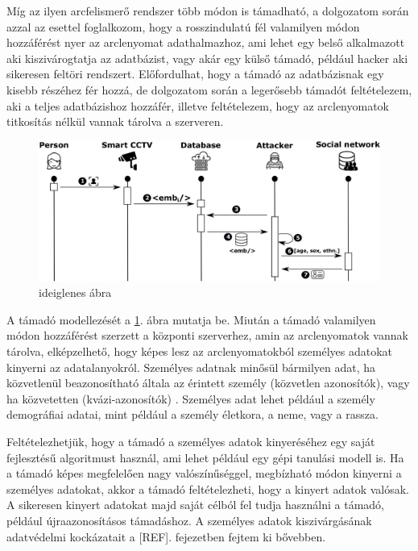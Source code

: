Míg az ilyen arcfelismerő rendszer több módon is támadható, a dolgozatom során azzal az esettel foglalkozom, hogy a rosszindulatú fél valamilyen módon hozzáférést nyer az arclenyomat adathalmazhoz, ami lehet egy belső alkalmazott aki kiszivárogtatja az adatbázist, vagy akár egy külső támadó, például hacker aki sikeresen feltöri rendszert. Előfordulhat, hogy a támadó az adatbázisnak egy kisebb részéhez fér hozzá, de dolgozatom során a legerősebb támadót feltételezem, aki a teljes adatbázishoz hozzáfér, illetve feltételezem, hogy az arclenyomatok titkosítás nélkül vannak tárolva a szerveren.

\begin{figure}[ht]
	\centering
	\includegraphics[width=1\columnwidth]{figures/attacker_model.png}
	\caption{ideiglenes ábra}
	\label{fig:attacker}
\end{figure}

A támadó modellezését a \ref{fig:attacker}. ábra mutatja be. Miután a támadó valamilyen módon hozzáférést szerzett a központi szerverhez, amin az arclenyomatok vannak tárolva, elképzelhető, hogy képes lesz az arclenyomatokból személyes adatokat kinyerni az adatalanyokról. Személyes adatnak minősül bármilyen adat, ha közvetlenül beazonosítható általa az érintett személy (közvetlen azonosítók), vagy ha közvetetten (kvázi-azonosítók) \cite{GDPR2018}. Személyes adat lehet például a személy demográfiai adatai, mint például a személy életkora, a neme, vagy a rassza. 

Feltételezhetjük, hogy a támadó a személyes adatok kinyeréséhez egy saját fejlesztésű algoritmust használ, ami lehet például egy gépi tanulási modell is. Ha a támadó képes megfelelően nagy valószínűséggel, megbízható módon kinyerni a személyes adatokat, akkor a támadó feltételezheti, hogy a kinyert adatok valósak. A sikeresen kinyert adatokat majd saját célból fel tudja használni a támadó, például újraazonosításos támadáshoz. A személyes adatok kiszivárgásának adatvédelmi kockázatait a [REF]. fejezetben fejtem ki bővebben.

